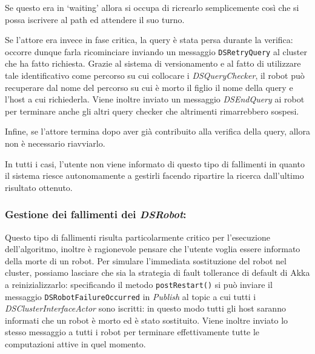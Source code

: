 Se questo era in `waiting' allora si occupa
di ricrearlo semplicemente così che si possa iscrivere al path ed
attendere il suo turno.

Se l'attore era invece in fase critica, la query è stata persa durante
la verifica: occorre dunque farla ricominciare inviando un messaggio
\texttt{DSRetryQuery} al cluster che ha fatto richiesta.
Grazie al sistema di versionamento e al fatto di utilizzare tale
identificativo come percorso su cui collocare i \emph{DSQueryChecker},
il robot può recuperare dal nome del percorso su cui è morto il figlio
il nome della query e l'host a cui richiederla.
Viene inoltre inviato un messaggio \emph{DSEndQuery} ai robot
per terminare anche gli altri query checker che altrimenti rimarrebbero
sospesi.

Infine, se l'attore termina dopo aver già contribuito alla verifica
della query, allora non è necessario riavviarlo.

In tutti i casi, l'utente non viene informato di questo tipo di
fallimenti in quanto il sistema riesce autonomamente a gestirli
facendo ripartire la ricerca dall'ultimo risultato ottenuto.

\subsubsection*{Gestione dei fallimenti dei \emph{DSRobot}:}
Questo tipo di fallimenti risulta particolarmente critico per
l'esecuzione dell'algoritmo, inoltre è ragionevole pensare che
l'utente voglia essere informato della morte di un robot.
Per simulare l'immediata sostituzione del robot nel cluster,
possiamo lasciare che sia la strategia di fault tollerance di default
di Akka a reinizializzarlo: specificando il metodo \texttt{postRestart()}
si può inviare il messaggio \texttt{DSRobotFailureOccurred}
in \emph{Publish} al topic a cui tutti i
\emph{DSClusterInterfaceActor} sono iscritti: in questo modo tutti gli
host saranno informati che un robot è morto ed è stato sostituito.
Viene inoltre inviato lo stesso messaggio a tutti i
robot per terminare effettivamente tutte le computazioni attive
in quel momento.



